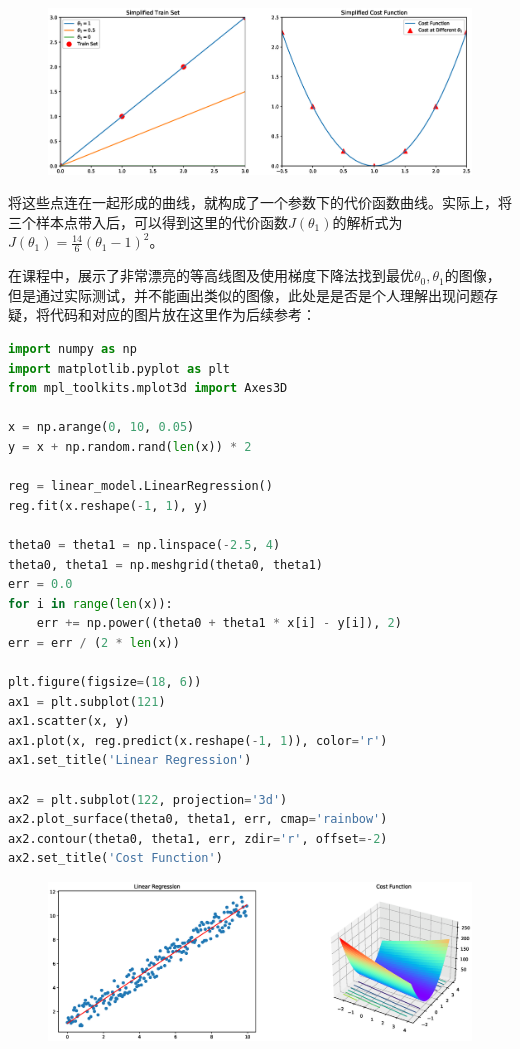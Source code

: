 \documentclass[12pt, a4paper]{article}
\begin{document}
\begin{figure}[H]
    \includegraphics[width=1\textwidth]{OneParameterCostFunction.eps}
\end{figure}

将这些点连在一起形成的曲线，就构成了一个参数下的代价函数曲线。实际上，将三个样本点带入后，可以得到这里的代价函数$J(\theta_1)$的解析式为$J(\theta_1)=\frac{14}{6}(\theta_1-1)^2$。

在课程中，展示了非常漂亮的等高线图及使用梯度下降法找到最优$\theta_0, \theta_1$的图像，但是通过实际测试，并不能画出类似的图像，此处是是否是个人理解出现问题存疑，将代码和对应的图片放在这里作为后续参考：

\begin{lstlisting}[language=Python]
import numpy as np
import matplotlib.pyplot as plt
from mpl_toolkits.mplot3d import Axes3D

x = np.arange(0, 10, 0.05)
y = x + np.random.rand(len(x)) * 2

reg = linear_model.LinearRegression()
reg.fit(x.reshape(-1, 1), y)

theta0 = theta1 = np.linspace(-2.5, 4)
theta0, theta1 = np.meshgrid(theta0, theta1)
err = 0.0
for i in range(len(x)):
    err += np.power((theta0 + theta1 * x[i] - y[i]), 2)
err = err / (2 * len(x))

plt.figure(figsize=(18, 6))
ax1 = plt.subplot(121)
ax1.scatter(x, y)
ax1.plot(x, reg.predict(x.reshape(-1, 1)), color='r')
ax1.set_title('Linear Regression')

ax2 = plt.subplot(122, projection='3d')
ax2.plot_surface(theta0, theta1, err, cmap='rainbow')
ax2.contour(theta0, theta1, err, zdir='r', offset=-2)
ax2.set_title('Cost Function')
           \end{lstlisting}

\begin{figure}[H]
    \includegraphics[width=1\textwidth]{CostFunction.eps}
\end{figure}
\end{document}

